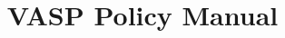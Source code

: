 \documentclass[]{report}
\title{VASP Policy Manual}
\author{\firmfullname}
\def\firmtag{twofish}
\begin{document}
\maketitle
\tableofcontents
\newpage
\listofcrossref
\newpage
\listofstatus








\appendix



\end{document}
